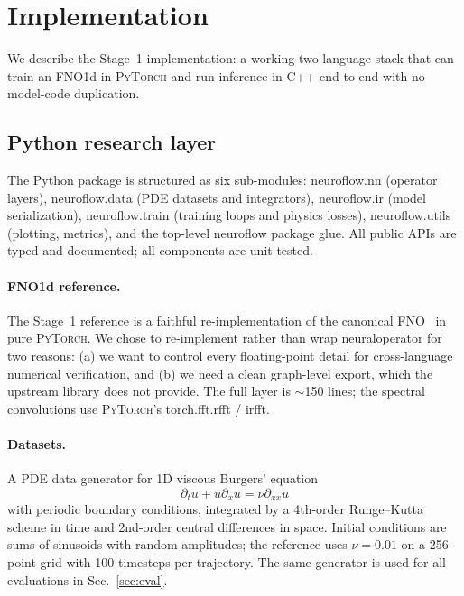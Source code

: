 \documentclass[10pt,twocolumn]{article}
\renewcommand{\texttt}[1]{{\normalfont\ttfamily #1}\normalfont\rmfamily}
\newcommand{\py}{\textsc{PyTorch}}
\begin{document}
\section{Implementation}

We describe the Stage~1 implementation: a working two-language
stack that can train an FNO1d in \py{} and run inference in
C{++} end-to-end with no model-code duplication.

\subsection{Python research layer}

The Python package is structured as six sub-modules:
\texttt{neuroflow.nn} (operator layers),
\texttt{neuroflow.data} (PDE datasets and integrators),
\texttt{neuroflow.ir} (model serialization),
\texttt{neuroflow.train} (training loops and physics losses),
\texttt{neuroflow.utils} (plotting, metrics), and the top-level
\texttt{neuroflow} package glue.  All public APIs are typed and
documented; all components are unit-tested.

\paragraph{FNO1d reference.}
The Stage~1 reference is a faithful re-implementation of the
canonical FNO~\cite{li2021fno} in pure \py{}.  We chose to
re-implement rather than wrap \texttt{neuraloperator} for two
reasons: (a) we want to control every floating-point detail for
cross-language numerical verification, and (b) we need a clean
graph-level export, which the upstream library does not provide.
The full layer is $\sim$150 lines; the spectral convolutions use
\py{}'s \texttt{torch.fft.rfft} / \texttt{irfft}.

\paragraph{Datasets.}
A PDE data generator for 1D viscous Burgers' equation
\[
  \partial_t u + u \partial_x u = \nu \partial_{xx} u
\]
with periodic boundary conditions, integrated by a 4th-order
Runge--Kutta scheme in time and 2nd-order central differences in
space.  Initial conditions are sums of sinusoids with random
amplitudes; the reference uses $\nu = 0.01$ on a 256-point grid
with 100 timesteps per trajectory.  The same generator is used
for all evaluations in Sec.~\ref{sec:eval}.
\end{document}
